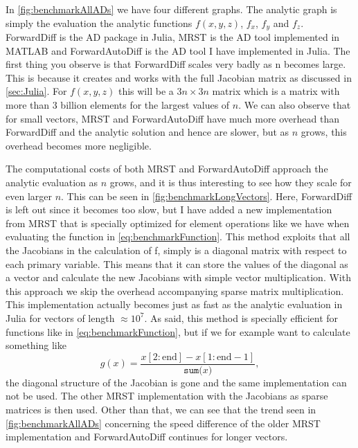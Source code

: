 In \autoref{fig:benchmarkAllADs} we have four different graphs. The analytic graph is simply the evaluation the analytic functions $f(x,y,z)$, $f_x$, $f_y$ and $f_z$. ForwardDiff is the AD package in Julia, MRST is the AD tool implemented in MATLAB and ForwardAutoDiff is the AD tool I have implemented in Julia. The first thing you observe is that ForwardDiff scales very badly as n becomes large. This is because it creates and works with the full Jacobian matrix as discussed in \autoref{sec:Julia}. For $f(x,y,z)$ this will be a $3n \times 3n$ matrix which is a matrix with more than 3 billion elements for the largest values of $n$. We can also observe that for small vectors, MRST and ForwardAutoDiff have much more overhead than ForwardDiff and the analytic solution and hence are slower, but as $n$ grows, this overhead becomes more negligible. 

The computational costs of both MRST and ForwardAutoDiff approach the analytic evaluation as $n$ grows, and it is thus interesting to see how they scale for even larger $n$. This can be seen in \autoref{fig:benchmarkLongVectors}. Here, ForwardDiff is left out since it becomes too slow, but I have added a new implementation from MRST that is specially optimized for element operations like we have when evaluating the function in \eqref{eq:benchmarkFunction}. This method exploits that all the Jacobians in the calculation of f, simply is a diagonal matrix with respect to each primary variable. This means that it can store the values of the diagonal as a vector and calculate the new Jacobians with simple vector multiplication. With this approach we skip the overhead accompanying sparse matrix multiplication. This implementation actually becomes just as fast as the analytic evaluation in Julia for vectors of length $\approx 10^7$. As said, this method is specially efficient for functions like in \eqref{eq:benchmarkFunction}, but if we for example want to calculate something like
\begin{equation}
g(x) = \frac{x\left[2:\text{end}\right] - x\left[1:\text{end}-1\right]}{\texttt{sum(}x\texttt{)}},
\label{eq:differenceFunction}
\end{equation}
the diagonal structure of the Jacobian is gone and the same implementation can not be used. The other MRST implementation with the Jacobians as sparse matrices is then used. Other than that, we can see that the trend seen in \autoref{fig:benchmarkAllADs} concerning the speed difference of the older MRST implementation and ForwardAutoDiff continues for longer vectors.


